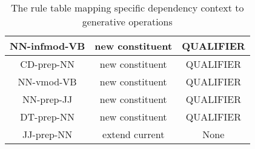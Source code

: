 \begin{table}[]
{\begin{tabular}{|c|c|c|}
            NN-infmod-VB          & new constituent             & QUALIFIER               \\ \hline
            CD-prep-NN            & new constituent             & QUALIFIER               \\ \hline
            NN-vmod-VB            & new constituent             & QUALIFIER               \\ \hline
            NN-prep-JJ            & new constituent             & QUALIFIER               \\ \hline
            DT-prep-NN            & new constituent             & QUALIFIER               \\ \hline
            JJ-prep-NN            & extend current              & None                    \\ \hline
        \end{tabular}%
    }
    \caption{The rule table mapping specific dependency context to generative operations}
    \label{tab:rule-table-complete1}
\end{table}
